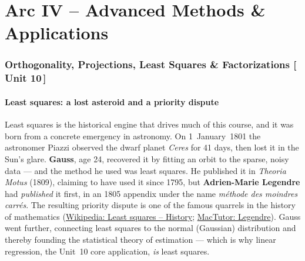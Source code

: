 \documentclass[11pt]{article}
\newcommand{\who}[1]{{\sffamily\bfseries #1}}
\newcommand{\yr}[1]{{\sffamily\color{BrickRed}(#1)}}
\newcommand{\unit}[1]{{\footnotesize\sffamily\color{RoyalBlue}[\,#1\,]}}
\begin{document}
\part*{Arc IV -- Advanced Methods \& Applications}

\section{Orthogonality, Projections, Least Squares \& Factorizations \unit{Unit 10}}

\subsection{Least squares: a lost asteroid and a priority dispute}
Least squares is the historical engine that drives much of this course, and it was
born from a concrete emergency in astronomy. On 1~January~1801 the astronomer
Piazzi observed the dwarf planet \emph{Ceres} for 41 days, then lost it in the
Sun's glare. \who{Gauss}, age 24, recovered it by fitting an orbit to the sparse,
noisy data --- and the method he used was least squares. He published it in
\emph{Theoria Motus} \yr{1809}, claiming to have used it since 1795, but
\who{Adrien-Marie Legendre} had \emph{published} it first, in an 1805 appendix
under the name \emph{m\'ethode des moindres carr\'es}. The resulting priority
dispute is one of the famous quarrels in the history of mathematics
(\href{https://en.wikipedia.org/wiki/Least_squares\#History}{Wikipedia: Least
squares -- History};
\href{https://mathshistory.st-andrews.ac.uk/Biographies/Legendre/}{MacTutor:
Legendre}). Gauss went further, connecting least squares to the normal (Gaussian)
distribution and thereby founding the statistical theory of estimation --- which is
why linear regression, the Unit~10 core application, \emph{is} least squares.
\end{document}
